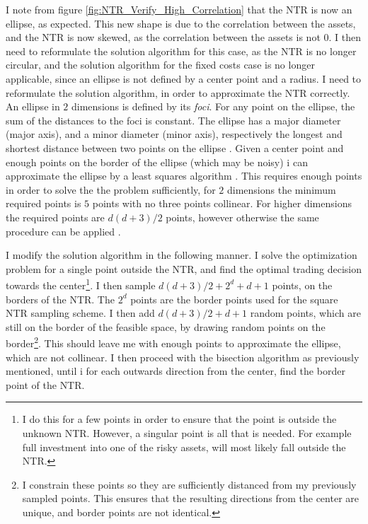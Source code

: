 \documentclass[11pt]{article}
\begin{document}
I note from figure \ref{fig:NTR_Verify_High_Correlation} that the NTR is now an ellipse, as expected.
This new shape is due to the correlation between the assets, and the NTR is now skewed, as the correlation between the assets is not $0$.
I then need to reformulate the solution algorithm for this case, as the NTR is no longer circular, and the solution algorithm for the fixed costs case is no longer applicable,
since an ellipse is not defined by a center point and a radius. I need to reformulate the solution algorithm, in order to approximate the NTR correctly.\\
An ellipse in $2$ dimensions is defined by its \textit{foci}. For any point on the ellipse, the sum of the distances to the foci is constant.
The ellipse has a major diameter (major axis), and a minor diameter (minor axis), respectively the longest and shortest distance between two points on the ellipse
\autocite{Ivanov2020Ellipse}. Given a center point and enough points on the border of the ellipse (which may be noisy)
i can approximate the ellipse by a least squares algorithm \autocite{gander1994least}. This requires enough points in order to solve the the problem sufficiently,
for $2$ dimensions the minimum required points is $5$ points with no three points collinear. For higher dimensions the required points are $d(d+3)/2$ points,
however otherwise the same procedure can be applied \autocite{bertoni2010multi}.

I modify the solution algorithm in the following manner.
I solve the optimization problem for a single point outside the NTR, and find the optimal trading decision towards the center\footnote{I do this for a few points in order to ensure that the point is outside the unknown NTR. However, a singular point is all that is needed. For example full investment into one of the risky assets, will most likely fall outside the NTR.}.
I then sample $d(d+3)/2+2^{d}+d+1$ points, on the borders of the NTR. The $2^{d}$ points are the border points used for the square \ac{NTR} sampling scheme.
I then add $d(d+3)/2+d+1$ random points, which are still on the border of the feasible space, by drawing random points on the border\footnote{I constrain these points so they are sufficiently distanced from my previously sampled points. This ensures that the resulting directions from the center are unique, and border points are not identical.}.
This should leave me with enough points to approximate the ellipse, which are not collinear.
I then proceed with the bisection algorithm as previously mentioned, until i for each outwards direction from the center, find the border point of the \ac{NTR}.
\end{document}
